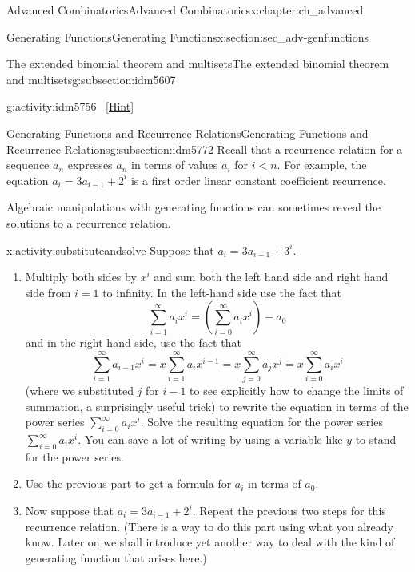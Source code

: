 \documentclass[oneside,10pt,]{book}
\numberwithin{equation}{chapter}
\newcommand{\lt}{<}
\begin{document}
\begin{chapterptx}{Advanced Combinatorics}{}{Advanced Combinatorics}{}{}{x:chapter:ch_advanced}
\begin{sectionptx}{Generating Functions}{}{Generating Functions}{}{}{x:section:sec_adv-genfunctions}
\begin{subsectionptx}{The extended binomial theorem and multisets}{}{The extended binomial theorem and multisets}{}{}{g:subsection:idm5607}
\begin{activity}{}{g:activity:idm5756}
\qquad~\hfill{\tiny\hyperlink{g:hint:idm5762-back}{[Hint]}}\end{activity}
\end{subsectionptx}
%
%
\typeout{************************************************}
\typeout{************************************************}
%
\begin{subsectionptx}{Generating Functions and Recurrence Relations}{}{Generating Functions and Recurrence Relations}{}{}{g:subsection:idm5772}
Recall that a recurrence relation for a sequence \(a_n\) expresses \(a_n\) in terms of values \(a_i\) for \(i\lt n\). For example, the equation \(a_i=3a_{i-1} +2^i\) is a first order linear constant coefficient recurrence.%
\par
Algebraic manipulations with generating functions can sometimes reveal the solutions to a recurrence relation.%
\begin{activity}{}{x:activity:substituteandsolve}%
Suppose that \(a_i=3a_{i-1} + 3^i\).%
\begin{enumerate}[font=\bfseries,label=(\alph*),ref=\alph*]
\item{}Multiply both sides by \(x^i\) and sum both the left hand side and right hand side from \(i=1\) to infinity.  In the left-hand side use the fact that%
\begin{equation*}
\sum_{i=1}^\infty a_ix^i = (\sum_{i=0}^\infty a_ix^i) - a_0
\end{equation*}
and in the right hand side, use the fact that%
\begin{equation*}
\sum_{i=1}^\infty a_{i-1}x^i = x\sum_{i=1}^\infty a_ix^{i-1}
=x\sum_{j=0}^\infty a_jx^j =x\sum_{i=0}^\infty a_ix^i
\end{equation*}
(where we substituted \(j\) for \(i-1\) to see explicitly how to change the limits of summation, a surprisingly useful trick) to rewrite the equation in terms of the power series \(\sum_{i=0}^\infty a_ix^i\).  Solve the resulting equation for the power series \(\sum_{i=0}^\infty a_ix^i\). You can save a lot of writing by using a variable like \(y\) to stand for the power series.%
\item{}Use the previous part to get a formula for \(a_i\) in terms of \(a_0\).%
\item{}Now suppose that \(a_i=3a_{i-1} + 2^i\).  Repeat the previous two steps for this recurrence relation.  (There is a way to do this part using what you already know.  Later on we shall introduce yet another way to deal with the kind of generating function that arises here.)%

\end{enumerate}
\end{activity}
\end{subsectionptx}
\end{sectionptx}
\end{chapterptx}
\end{document}
